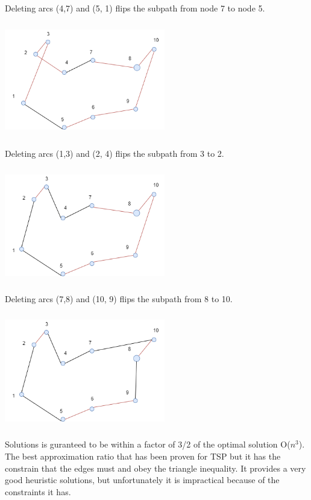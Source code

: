 \documentclass[12pt]{article}
\newcounter{subsubsubsection}[subsubsection]
\begin{document}
Deleting arcs (4,7) and (5, 1) flips the subpath from node 7 to node 5. 
\begin{center}
	\includegraphics[width=7cm,height=5cm]{./assets/example/2-opt-2.png}
\end{center}
Deleting arcs (1,3) and (2, 4) flips the subpath from 3 to 2. 
\begin{center}
	\includegraphics[width=7cm,height=5cm]{./assets/example/2-opt-3.png}
\end{center}
Deleting arcs (7,8) and (10, 9) flips the subpath from 8 to 10. 
\begin{center}
	\includegraphics[width=7cm,height=5cm]{./assets/example/2-opt-4.png}
\end{center}

Solutions is guranteed to be within a factor of 3/2 of the optimal solution O($n^3$). The best approximation ratio that has been proven for TSP but it has the constrain that the edges must and obey the triangle inequality. It provides a very good heuristic solutions, but unfortunately it is  impractical because of the constraints it has.
\end{document}
